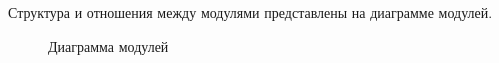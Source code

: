 Структура и отношения между модулями представлены на диаграмме модулей.
 \begin{figure}[ht]
	\caption{Диаграмма модулей}
	\label{modules_diagram:image}
\end{figure}


